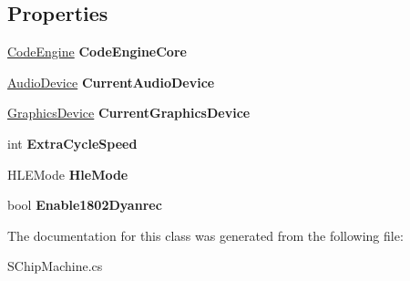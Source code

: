\subsection*{Properties}
\begin{DoxyCompactItemize}
\item 
\hypertarget{class_eimu_1_1_core_1_1_systems_1_1_s_chip8_1_1_s_chip_machine_a7b84018fd4b19417a162bd28826b4d45}{
\hyperlink{class_eimu_1_1_core_1_1_systems_1_1_s_chip8_1_1_code_engine}{CodeEngine} {\bfseries CodeEngineCore}}
\label{class_eimu_1_1_core_1_1_systems_1_1_s_chip8_1_1_s_chip_machine_a7b84018fd4b19417a162bd28826b4d45}

\item 
\hypertarget{class_eimu_1_1_core_1_1_systems_1_1_s_chip8_1_1_s_chip_machine_ad5484d9abdcf0ef9e65a4c3d099f8a4e}{
\hyperlink{class_eimu_1_1_core_1_1_systems_1_1_s_chip8_1_1_audio_device}{AudioDevice} {\bfseries CurrentAudioDevice}}
\label{class_eimu_1_1_core_1_1_systems_1_1_s_chip8_1_1_s_chip_machine_ad5484d9abdcf0ef9e65a4c3d099f8a4e}

\item 
\hypertarget{class_eimu_1_1_core_1_1_systems_1_1_s_chip8_1_1_s_chip_machine_af19c24fe10b15fe343426cbf42028453}{
\hyperlink{class_eimu_1_1_core_1_1_systems_1_1_s_chip8_1_1_graphics_device}{GraphicsDevice} {\bfseries CurrentGraphicsDevice}}
\label{class_eimu_1_1_core_1_1_systems_1_1_s_chip8_1_1_s_chip_machine_af19c24fe10b15fe343426cbf42028453}

\item 
\hypertarget{class_eimu_1_1_core_1_1_systems_1_1_s_chip8_1_1_s_chip_machine_a29a87acb1d7726ce0c40b565ec10b9e7}{
int {\bfseries ExtraCycleSpeed}}
\label{class_eimu_1_1_core_1_1_systems_1_1_s_chip8_1_1_s_chip_machine_a29a87acb1d7726ce0c40b565ec10b9e7}

\item 
\hypertarget{class_eimu_1_1_core_1_1_systems_1_1_s_chip8_1_1_s_chip_machine_a95cd98f9494a16733605b5d235a7b78f}{
HLEMode {\bfseries HleMode}}
\label{class_eimu_1_1_core_1_1_systems_1_1_s_chip8_1_1_s_chip_machine_a95cd98f9494a16733605b5d235a7b78f}

\item 
\hypertarget{class_eimu_1_1_core_1_1_systems_1_1_s_chip8_1_1_s_chip_machine_af1cd6c40b2e6fce79c0d48b3146149be}{
bool {\bfseries Enable1802Dyanrec}}
\label{class_eimu_1_1_core_1_1_systems_1_1_s_chip8_1_1_s_chip_machine_af1cd6c40b2e6fce79c0d48b3146149be}

\end{DoxyCompactItemize}


The documentation for this class was generated from the following file:\begin{DoxyCompactItemize}
\item 
SChipMachine.cs\end{DoxyCompactItemize}
